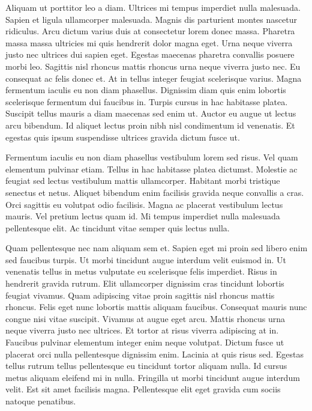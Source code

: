 \documentclass[a4paper]{article}
\begin{document}
Aliquam ut porttitor leo a diam. Ultrices mi tempus imperdiet nulla malesuada. Sapien et ligula ullamcorper malesuada. Magnis dis parturient montes nascetur ridiculus. Arcu dictum varius duis at consectetur lorem donec massa. Pharetra massa massa ultricies mi quis hendrerit dolor magna eget. Urna neque viverra justo nec ultrices dui sapien eget. Egestas maecenas pharetra convallis posuere morbi leo. Sagittis nisl rhoncus mattis rhoncus urna neque viverra justo nec. Eu consequat ac felis donec et. At in tellus integer feugiat scelerisque varius. Magna fermentum iaculis eu non diam phasellus. Dignissim diam quis enim lobortis scelerisque fermentum dui faucibus in. Turpis cursus in hac habitasse platea. Suscipit tellus mauris a diam maecenas sed enim ut. Auctor eu augue ut lectus arcu bibendum. Id aliquet lectus proin nibh nisl condimentum id venenatis. Et egestas quis ipsum suspendisse ultrices gravida dictum fusce ut.

Fermentum iaculis eu non diam phasellus vestibulum lorem sed risus. Vel quam elementum pulvinar etiam. Tellus in hac habitasse platea dictumst. Molestie ac feugiat sed lectus vestibulum mattis ullamcorper. Habitant morbi tristique senectus et netus. Aliquet bibendum enim facilisis gravida neque convallis a cras. Orci sagittis eu volutpat odio facilisis. Magna ac placerat vestibulum lectus mauris. Vel pretium lectus quam id. Mi tempus imperdiet nulla malesuada pellentesque elit. Ac tincidunt vitae semper quis lectus nulla.

Quam pellentesque nec nam aliquam sem et. Sapien eget mi proin sed libero enim sed faucibus turpis. Ut morbi tincidunt augue interdum velit euismod in. Ut venenatis tellus in metus vulputate eu scelerisque felis imperdiet. Risus in hendrerit gravida rutrum. Elit ullamcorper dignissim cras tincidunt lobortis feugiat vivamus. Quam adipiscing vitae proin sagittis nisl rhoncus mattis rhoncus. Felis eget nunc lobortis mattis aliquam faucibus. Consequat mauris nunc congue nisi vitae suscipit. Vivamus at augue eget arcu. Mattis rhoncus urna neque viverra justo nec ultrices. Et tortor at risus viverra adipiscing at in. Faucibus pulvinar elementum integer enim neque volutpat. Dictum fusce ut placerat orci nulla pellentesque dignissim enim. Lacinia at quis risus sed. Egestas tellus rutrum tellus pellentesque eu tincidunt tortor aliquam nulla. Id cursus metus aliquam eleifend mi in nulla. Fringilla ut morbi tincidunt augue interdum velit. Est sit amet facilisis magna. Pellentesque elit eget gravida cum sociis natoque penatibus.
\end{document}
